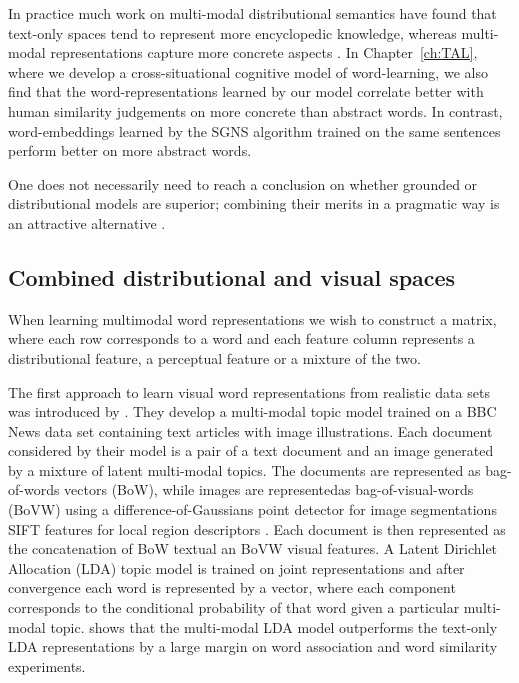 In practice much work on multi-modal distributional semantics have found that text-only spaces tend to
represent more encyclopedic knowledge, whereas multi-modal representations capture more concrete aspects
\citep{andrews2009integrating,baroni2008concepts}. In Chapter~\ref{ch:TAL}, where we develop
a cross-situational cognitive model of word-learning, we also find that the word-representations learned by
our model correlate better with human similarity judgements on more concrete than abstract words.
In contrast, word-embeddings learned by the SGNS algorithm trained on the same sentences
perform better on more abstract words.

One does not necessarily need to reach a conclusion on whether grounded or distributional
models are superior;  combining their merits in a
pragmatic way is an attractive alternative \citep{riordan2011redundancy}.


\subsection{Combined distributional and visual spaces}
\label{sec:distvis}

When learning multimodal word representations we wish to construct a matrix,
where each row 
corresponds to a word and each feature column
represents a distributional feature, a perceptual feature or a mixture of the two.

The first approach to learn visual word representations from realistic data sets
was introduced by \cite{feng2010visual}. They develop a multi-modal topic model trained on a
BBC News data set containing text articles with image illustrations.
Each document considered by their model is a pair of a text document  and  an image generated by
a mixture of latent multi-modal topics. The documents are represented as bag-of-words vectors (BoW), while 
images are representedas bag-of-visual-words (BoVW)  \citep{csurka2004visual} using a
difference-of-Gaussians point detector for image segmentations
SIFT features for local region descriptors \citep{lowe1999object}.
Each document is then represented as the concatenation of BoW textual an BoVW visual features.
A Latent Dirichlet Allocation (LDA) \citep{blei2003latent} topic model is trained
on joint representations and after convergence each word is represented by a vector,
where each component corresponds to the conditional probability of that word given
a particular multi-modal topic. \cite{feng2010visual}
shows that the multi-modal LDA model outperforms the text-only LDA representations by a
large margin on word association and word similarity experiments.

